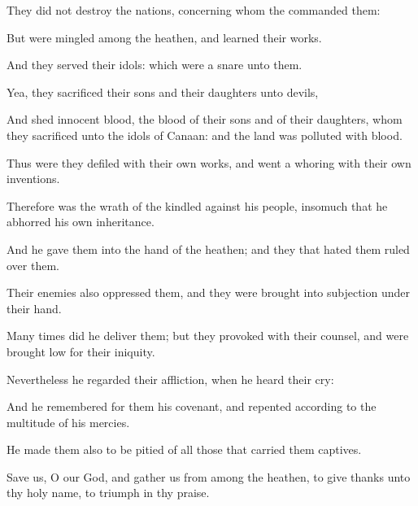 {\Q {}They did not
destroy the
nations, concerning whom the
{}
commanded them:


\par }{\Q {}But were
mingled among the
heathen, and
learned their
works.


\par }{\Q {}And they
served their
idols: which were a
snare unto them.


\par }{\Q {}Yea, they
sacrificed their
sons and their
daughters unto
devils,


\par }{\Q {}And
shed
innocent
blood,
{} the
blood of their
sons and of their
daughters, whom they
sacrificed unto the
idols of
Canaan: and the
land was
polluted with
blood.


\par }{\Q {}Thus were they
defiled with their own
works, and went a
whoring with their own
inventions.


\par }{\Q {}Therefore was the
wrath of the
{}
kindled against his
people, insomuch that he
abhorred his own
inheritance.


\par }{\Q {}And he
gave them into the
hand of the
heathen; and they that
hated them
ruled over them.


\par }{\Q {}Their
enemies also
oppressed them, and they were brought into
subjection under their
hand.


\par }{\Q {}Many
times did he
deliver them; but they
provoked
{} with their
counsel, and were brought
low for their
iniquity.


\par }{\Q {}Nevertheless he
regarded their
affliction, when he
heard their
cry:


\par }{\Q {}And he
remembered for them his
covenant, and
repented according to the
multitude of his
mercies.


\par }{\Q {}He
made them also to be
pitied
of all those that carried them
captives.


\par }{\Q {}Save us, O
{} our
God, and
gather us from among the
heathen, to give
thanks unto thy
holy
name,
{} to
triumph in thy
praise.


}
